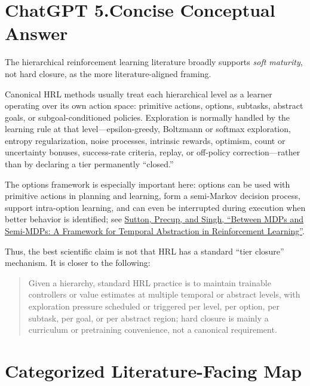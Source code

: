 \documentclass[11pt]{article}
\begin{document}
\section{ChatGPT 5.Concise Conceptual Answer}

The hierarchical reinforcement learning literature broadly supports
\emph{soft maturity}, not hard closure, as the more literature-aligned
framing.

Canonical HRL methods usually treat each hierarchical level as a learner
operating over its own action space: primitive actions, options, subtasks,
abstract goals, or subgoal-conditioned policies. Exploration is normally
handled by the learning rule at that level---epsilon-greedy, Boltzmann or
softmax exploration, entropy regularization, noise processes, intrinsic
rewards, optimism, count or uncertainty bonuses, success-rate criteria,
replay, or off-policy correction---rather than by declaring a tier
permanently ``closed.''

The options framework is especially important here: options can be used
with primitive actions in planning and learning, form a semi-Markov
decision process, support intra-option learning, and can even be
interrupted during execution when better behavior is identified; see
\href{https://www.sciencedirect.com/science/article/pii/S0004370299000521}
{Sutton, Precup, and Singh, ``Between MDPs and Semi-MDPs: A Framework for
Temporal Abstraction in Reinforcement Learning''}.

Thus, the best scientific claim is not that HRL has a standard
``tier closure'' mechanism. It is closer to the following:

\begin{quote}
Given a hierarchy, standard HRL practice is to maintain trainable
controllers or value estimates at multiple temporal or abstract levels,
with exploration pressure scheduled or triggered per level, per option,
per subtask, per goal, or per abstract region; hard closure is mainly a
curriculum or pretraining convenience, not a canonical requirement.
\end{quote}

\section{Categorized Literature-Facing Map}
\end{document}

